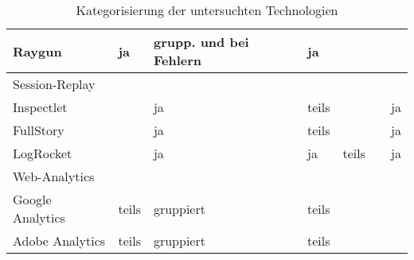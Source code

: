 \begin{table}
\begin{tabular}{|p{4.15cm}|p{1.4cm}|p{2.0cm}|p{1.9cm}|p{2.0cm}|p{1.4cm}|p{1.4cm}|}
\hline
Raygun & ja & grupp. und bei \mbox{Fehlern} & ja &  &  &  \\
\hline
\hline
\multicolumn{7}{|p{12.25cm}|}{Session-Replay} \\
\hline
Inspectlet &  & ja & teils &  &  & ja \\
\hline
FullStory &  & ja & teils &  &  & ja \\
\hline
LogRocket &  & ja & ja & teils &  & ja \\
\hline
\hline
\multicolumn{7}{|p{12.25cm}|}{Web-Analytics} \\
\hline
Google Analytics & teils & gruppiert & teils &  &  &  \\
\hline
Adobe Analytics & teils & gruppiert & teils &  &  &  \\
\hline
\end{tabular}
\caption{Kategorisierung der untersuchten Technologien}
\label{tab:technologie-kategorisierung}
\end{table}